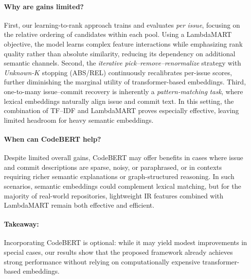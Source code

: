 \paragraph{Why are gains limited?}
First, our learning-to-rank approach trains and evaluates \emph{per issue}, focusing on the relative ordering of candidates within each pool. Using a LambdaMART objective, the model learns complex feature interactions while emphasizing rank quality rather than absolute similarity, reducing its dependency on additional semantic channels. Second, the \emph{iterative pick--remove--renormalize} strategy with \emph{Unknown-$K$} stopping (ABS/REL) continuously recalibrates per-issue scores, further diminishing the marginal utility of transformer-based embeddings. Third, one-to-many issue--commit recovery is inherently a \emph{pattern-matching task}, where lexical embeddings naturally align issue and commit text. In this setting, the combination of TF--IDF and LambdaMART proves especially effective, leaving limited headroom for heavy semantic embeddings.


\paragraph{When can CodeBERT help?}
Despite limited overall gains, CodeBERT may offer benefits in cases where issue and commit descriptions are sparse, noisy, or paraphrased, or in contexts requiring richer semantic explanations or graph-structured reasoning. In such scenarios, semantic embeddings could complement lexical matching, but for the majority of real-world repositories, lightweight IR features combined with LambdaMART remain both effective and efficient.

\paragraph{Takeaway:}
Incorporating CodeBERT is optional: while it may yield modest improvements in special cases, our results show that the proposed framework already achieves strong performance without relying on computationally expensive transformer-based embeddings.






